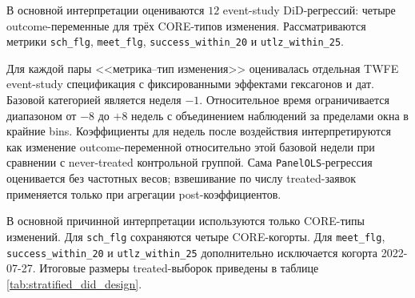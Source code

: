 \documentclass[14pt,a4paper]{extarticle}
\begin{document}
В основной интерпретации оцениваются \(12\) event-study DiD-регрессий: четыре outcome-переменные для трёх CORE-типов изменения. Рассматриваются метрики \texttt{sch\_flg}, \texttt{meet\_flg}, \texttt{success\_within\_20} и \texttt{utlz\_within\_25}.

Для каждой пары <<метрика--тип изменения>> оценивалась отдельная TWFE event-study спецификация с фиксированными эффектами гексагонов и дат. Базовой категорией является неделя \(-1\). Относительное время ограничивается диапазоном от \(-8\) до \(+8\) недель с объединением наблюдений за пределами окна в крайние bins. Коэффициенты для недель после воздействия интерпретируются как изменение outcome-переменной относительно этой базовой недели при сравнении с never-treated контрольной группой. Сама \texttt{PanelOLS}-регрессия оценивается без частотных весов; взвешивание по числу treated-заявок применяется только при агрегации post-коэффициентов.

В основной причинной интерпретации используются только CORE-типы изменений. Для \texttt{sch\_flg} сохраняются четыре CORE-когорты. Для \texttt{meet\_flg}, \texttt{success\_within\_20} и \texttt{utlz\_within\_25} дополнительно исключается когорта 2022-07-27. Итоговые размеры treated-выборок приведены в таблице \ref{tab:stratified_did_design}.
\end{document}
